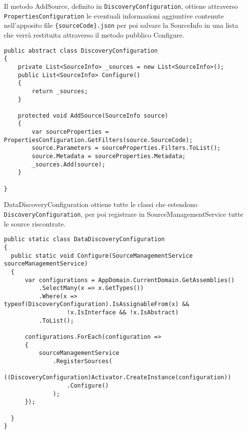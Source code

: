 Il metodo AddSource, definito in \verb|DiscoveryConfiguration|, ottiene attraverso \verb|PropertiesConfiguration| le eventuali informazioni aggiuntive contenute nell’apposito file \verb|{sourceCode}.json| per poi salvare la SourceInfo in una lista che verrà restituita attraverso il metodo pubblico Configure.
\begin{lstlisting}[caption={DiscoveryConfiguration.cs}, style=sharpCode]
public abstract class DiscoveryConfiguration
{
    private List<SourceInfo> _sources = new List<SourceInfo>();
    public List<SourceInfo> Configure()
    {
        return _sources;
    }

    protected void AddSource(SourceInfo source)
    {
        var sourceProperties = PropertiesConfiguration.GetFilters(source.SourceCode);
        source.Parameters = sourceProperties.Filters.ToList();
        source.Metadata = sourceProperties.Metadata;
        _sources.Add(source);
    }

}
\end{lstlisting}
DataDiscoveryConfiguration ottiene tutte le classi che estendono \verb|DiscoveryConfiguration|, per poi registrare in SourceManagementService tutte le source riscontrate.
\begin{lstlisting}[caption={DataDiscoveryConfiguraton.cs}, style=sharpCode]
public static class DataDiscoveryConfiguration
{
  public static void Configure(SourceManagementService sourceManagementService)
  {
      var configurations = AppDomain.CurrentDomain.GetAssemblies()
          .SelectMany(x => x.GetTypes())
          .Where(x => typeof(DiscoveryConfiguration).IsAssignableFrom(x) && 
                  !x.IsInterface && !x.IsAbstract)
          .ToList();

      configurations.ForEach(configuration =>
      {
          sourceManagementService
              .RegisterSources(
                  ((DiscoveryConfiguration)Activator.CreateInstance(configuration))
                  .Configure()
              );
      });

  }
}
\end{lstlisting}
